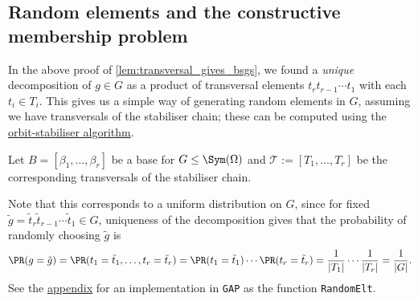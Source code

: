 \subsection{Random elements and the constructive membership problem}

In the above proof of \autoref{lem:transversal_gives_bsgs}, we found a \textit{unique} decomposition of $g \in G$ as a product of transversal elements $t_rt_{r-1}\dotsb t_1$ with each $t_i \in T_i$. This gives us a simple way of generating random elements in $G$,  assuming we have transversals of the stabiliser chain; these can be computed using the \hyperref[alg:orbit_stabiliser]{orbit-stabiliser algorithm}.

\begin{algorithm}\label{alg:transversal_random_element}
    Let $B = [\beta_1,\dotsc,\beta_r]$ be a base for $G \leq \Sym(\Omega)$ and $\mathcal{T} := [T_1,\dotsc,T_r]$ be the corresponding transversals of the stabiliser chain. 
\end{algorithm}

Note that this corresponds to a uniform distribution on $G$, since for fixed $\tilde g = \tilde t_r\tilde t_{r-1}\dotsb\tilde t_1 \in G$,  uniqueness of the decomposition gives that the probability of randomly choosing $\tilde g$ is
$$\PR(g = \tilde g) = \PR(t_1 = \tilde t_1,\dotsc,t_r = \tilde t_r) = \PR(t_1 = \tilde t_1) \dotsb \PR(t_r = \tilde t_r) = \frac{1}{|T_1|} \dotsb \frac{1}{|T_r|} = \frac{1}{|G|}.$$
 See the \hyperref[app:transversal_random_element]{appendix} for an implementation in \texttt{GAP} as the function \texttt{RandomElt}.


